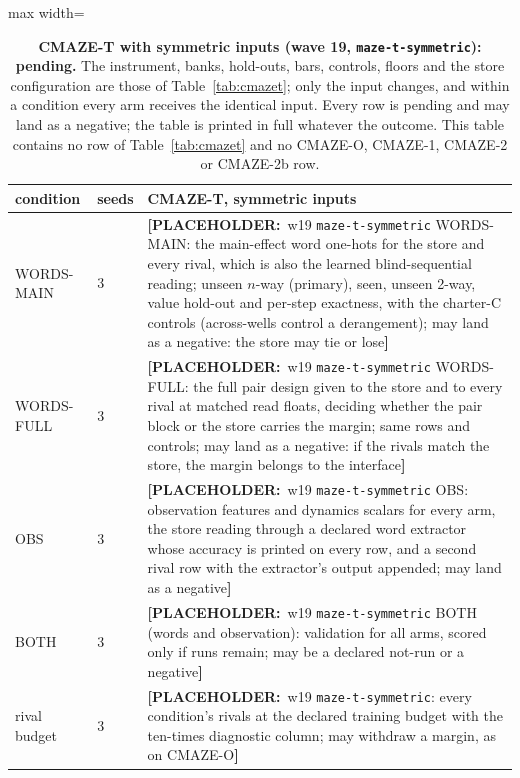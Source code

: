 \documentclass{article} %
\newcommand{\PLACEHOLDER}[1]{{\color{red}\textbf{[PLACEHOLDER:}~#1\textbf{]}}}
\begin{document}
\begin{table}[h]
\centering\scriptsize
\caption{\textbf{CMAZE-T with symmetric inputs (wave 19, \texttt{maze-t-symmetric}): pending.} The %
instrument, banks, hold-outs, bars, controls, floors and the store configuration are those of
Table~\ref{tab:cmazet}; only the input changes, and within a condition every arm receives the
identical input. Every row is pending and may land as a negative; the table is printed in full
whatever the outcome. This table contains no row of Table~\ref{tab:cmazet} and no CMAZE-O,
CMAZE-1, CMAZE-2 or CMAZE-2b row.}
\label{tab:cmazet-sym}
\setlength{\tabcolsep}{2pt}
\begin{adjustbox}{max width=\linewidth}\begin{tabular}{p{1.9cm}p{1.2cm}p{10.0cm}}
\toprule
condition & seeds & CMAZE-T, symmetric inputs \\
\midrule
WORDS-MAIN & 3 & \PLACEHOLDER{w19 \texttt{maze-t-symmetric} WORDS-MAIN: the main-effect word one-hots for the store and every rival, which is also the learned blind-sequential reading; unseen $n$-way (primary), seen, unseen 2-way, value hold-out and per-step exactness, with the charter-C controls (across-wells control a derangement); may land as a negative: the store may tie or lose} \\
WORDS-FULL & 3 & \PLACEHOLDER{w19 \texttt{maze-t-symmetric} WORDS-FULL: the full pair design given to the store and to every rival at matched read floats, deciding whether the pair block or the store carries the margin; same rows and controls; may land as a negative: if the rivals match the store, the margin belongs to the interface} \\
OBS & 3 & \PLACEHOLDER{w19 \texttt{maze-t-symmetric} OBS: observation features and dynamics scalars for every arm, the store reading through a declared word extractor whose accuracy is printed on every row, and a second rival row with the extractor's output appended; may land as a negative} \\
BOTH & 3 & \PLACEHOLDER{w19 \texttt{maze-t-symmetric} BOTH (words and observation): validation for all arms, scored only if runs remain; may be a declared not-run or a negative} \\
rival budget & 3 & \PLACEHOLDER{w19 \texttt{maze-t-symmetric}: every condition's rivals at the declared training budget with the ten-times diagnostic column; may withdraw a margin, as on CMAZE-O} \\

\end{tabular}
\end{adjustbox}
\end{table}
\end{document}
